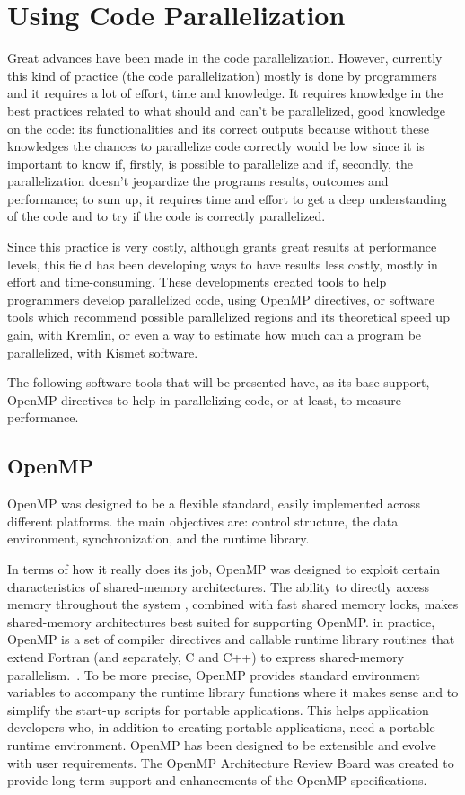 \section{Using Code Parallelization}
Great advances have been made in the code parallelization. However, currently this kind of practice (the code parallelization) mostly is done by programmers and it requires a lot of effort, time and knowledge. It requires knowledge in the best practices related to what should and can't be parallelized, good knowledge on the code: its functionalities and its correct outputs because without these knowledges the chances to parallelize code correctly would be low since it is important to know if, firstly, is possible to parallelize and if, secondly, the parallelization doesn't jeopardize the programs results, outcomes and performance; to sum up, it requires time and effort to get a deep understanding of the code and to try if the code is correctly parallelized.~\cite{Jeon}

Since this practice is very costly, although grants great results at performance levels, this field has been developing ways to have results less costly, mostly in effort and time-consuming. These developments created tools to help programmers develop parallelized code, using OpenMP directives, or software tools which recommend possible parallelized regions and its theoretical speed up gain, with Kremlin, or even a way to estimate how much can a program be parallelized, with Kismet software.~\cite{Saturnino}

The following software tools that will be presented have, as its base support, OpenMP directives to help in parallelizing code, or at least, to measure performance.

\subsection{OpenMP}
OpenMP was designed to be a flexible standard, easily implemented across different platforms. the main objectives are: control structure, the data environment, synchronization, and the runtime library. 

In terms of how it really does its job, OpenMP was designed to exploit certain characteristics of shared-memory architectures. The ability to directly access memory throughout the system , combined with fast shared memory locks, makes shared-memory architectures best suited for supporting OpenMP. in practice, OpenMP is a set of compiler directives and callable runtime library routines that extend Fortran (and separately, C and C++) to express shared-memory parallelism.~\cite{Nc1998}. To be more precise, OpenMP provides standard environment variables to accompany the runtime library functions where it makes sense and to simplify  the start-up scripts for portable applications. This helps application developers who, in addition to creating portable applications, need a portable runtime environment. OpenMP has been designed to be extensible and evolve with user requirements. The OpenMP Architecture Review Board was created to provide long-term support and enhancements of the OpenMP specifications. 


